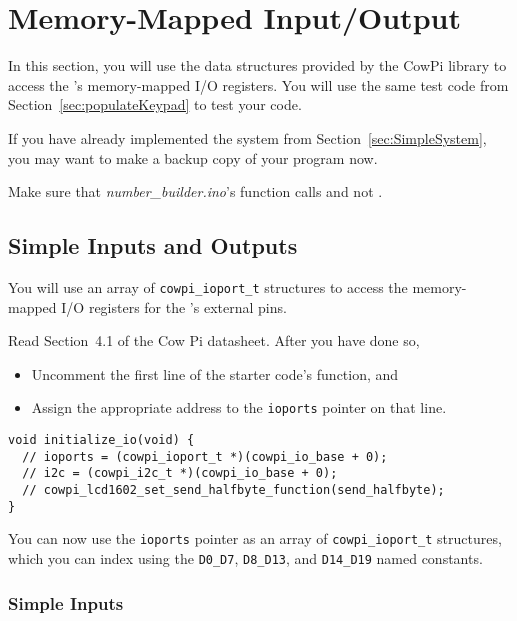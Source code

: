 \section{Memory-Mapped Input/Output} \label{sec:MemMapIO}

In this section, you will use the data structures provided by the CowPi library to access the \developmentboard's memory-mapped I/O registers.
You will use the same test code from Section~\ref{sec:populateKeypad} to test your code.

If you have already implemented the system from Section~\ref{sec:SimpleSystem}, you may want to make a backup copy of your program now.

Make sure that \textit{number\_builder.ino}'s  function calls  and not .

\subsection{Simple Inputs and Outputs}

You will use an array of \lstinline{cowpi_ioport_t} structures to access the memory-mapped I/O registers for the \developmentboard's external pins.

Read Section~4.1 of the Cow Pi datasheet.
After you have done so,
\begin{itemize}
    \item Uncomment the first line of the starter code's  function, and
    \item Assign the appropriate address to the \lstinline{ioports} pointer on that line.
\end{itemize}

\begin{lstlisting}
void initialize_io(void) {
  // ioports = (cowpi_ioport_t *)(cowpi_io_base + 0);
  // i2c = (cowpi_i2c_t *)(cowpi_io_base + 0);
  // cowpi_lcd1602_set_send_halfbyte_function(send_halfbyte);
}
\end{lstlisting}

You can now use the \lstinline{ioports} pointer as an array of \lstinline{cowpi_ioport_t} structures, which you can index using the \lstinline{D0_D7}, \lstinline{D8_D13}, and \lstinline{D14_D19} named constants.

\subsubsection{Simple Inputs}


